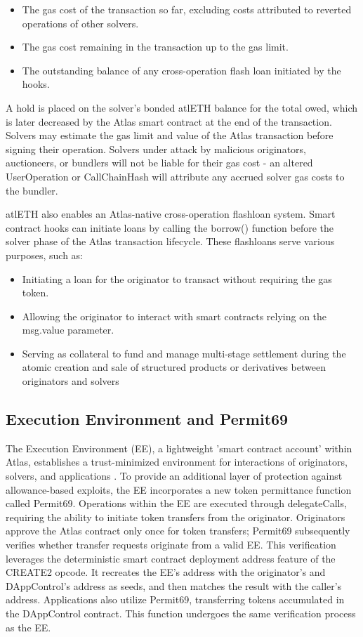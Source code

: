\documentclass{article}
\begin{document}
\begin{itemize}
\item The gas cost of the transaction so far, excluding costs attributed to reverted operations of other solvers.
\item The gas cost remaining in the transaction up to the gas limit.
\item The outstanding balance of any cross-operation flash loan initiated by the hooks.
\end{itemize}

A hold is placed on the solver’s bonded atlETH balance for the total owed, which is later decreased by the Atlas smart contract at the end of the transaction. Solvers may estimate the gas limit and value of the Atlas transaction before signing their operation. Solvers under attack by malicious originators, auctioneers, or bundlers will not be liable for their gas cost - an altered UserOperation or CallChainHash will attribute any accrued solver gas costs to the bundler.

atlETH also enables an Atlas-native cross-operation flashloan system. Smart contract hooks can initiate loans by calling the borrow() function before the solver phase of the Atlas transaction lifecycle. These flashloans serve various purposes, such as:
\begin{itemize}
\item Initiating a loan for the originator to transact without requiring the gas token.
\item Allowing the originator to interact with smart contracts relying on the msg.value parameter.
\item Serving as collateral to fund and manage multi-stage settlement during the atomic creation and sale of structured products or derivatives between originators and solvers
\end{itemize}

\subsection{Execution Environment and Permit69}
The Execution Environment (EE), a lightweight 'smart contract account' within Atlas, establishes a trust-minimized environment for interactions of originators, solvers, and applications \cite{bnative}. To provide an additional layer of protection against allowance-based exploits, the EE incorporates a new token permittance function called Permit69. Operations within the EE are executed through delegateCalls, requiring the ability to initiate token transfers from the originator. Originators approve the Atlas contract only once for token transfers; Permit69 subsequently verifies whether transfer requests originate from a valid EE. This verification leverages the deterministic smart contract deployment address feature of the CREATE2 opcode. It recreates the EE’s address with the originator’s and DAppControl’s address as seeds, and then matches the result with the caller’s address. Applications also utilize Permit69, transferring tokens accumulated in the DAppControl contract. This function undergoes the same verification process as the EE.
\end{document}
